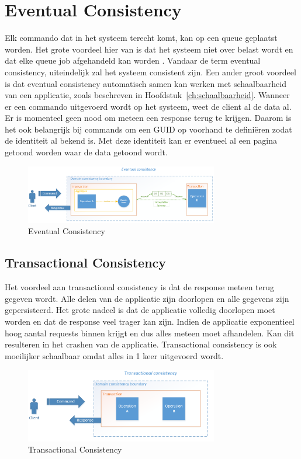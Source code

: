 
\section{Eventual Consistency}
\label{sec:eventual-consistency}

Elk commando dat in het systeem terecht komt, kan op een queue geplaatst worden. Het grote voordeel hier van is dat het systeem niet over belast wordt en dat elke queue job afgehandeld kan worden \autocite{King2015EventualConsistency}. Vandaar de term eventual consistency, uiteindelijk zal het systeem consistent zijn. Een ander groot voordeel is dat eventual consistency automatisch samen kan werken met schaalbaarheid van een applicatie, zoals beschreven in Hoofdstuk~\ref{ch:schaalbaarheid}. Wanneer er een commando uitgevoerd wordt op het systeem, weet de client al de data al. Er is momenteel geen nood om meteen een response terug te krijgen.
Daarom is het ook belangrijk bij commands om een \gls{GUID} op voorhand te definiëren zodat de identiteit al bekend is. Met deze identiteit kan er eventueel al een pagina getoond worden waar de data getoond wordt.

\begin{figure}[h]
\caption{Eventual Consistency}
\centering
\includegraphics[width=0.75\textwidth]{img/eventual-consistency}
\end{figure}

\subsection{Transactional Consistency}
\label{subsec:transactional-consistency}

Het voordeel aan transactional consistency is dat de response meteen terug gegeven wordt. Alle delen van de applicatie zijn doorlopen en alle gegevens zijn gepersisteerd. Het grote nadeel is dat de applicatie volledig doorlopen moet worden en dat de response veel trager kan zijn. Indien de applicatie exponentieel hoog aantal requests binnen krijgt en dus alles meteen moet afhandelen. Kan dit resulteren in het crashen van de applicatie.
Transactional consistency is ook moeilijker schaalbaar omdat alles in 1 keer uitgevoerd wordt.

\begin{figure}[h]
\caption{Transactional Consistency}
\centering
\includegraphics[width=0.75\textwidth]{img/transactional-consistency}
\end{figure}
